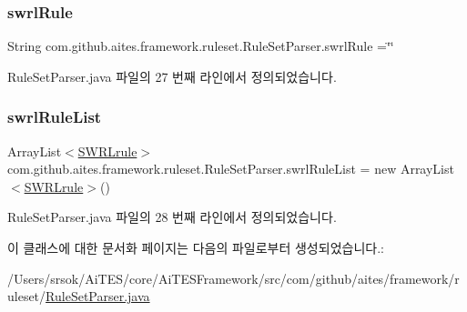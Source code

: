 \subsubsection{\texorpdfstring{swrl\+Rule}{swrlRule}}
{\footnotesize\ttfamily String com.\+github.\+aites.\+framework.\+ruleset.\+Rule\+Set\+Parser.\+swrl\+Rule =\char`\"{}\char`\"{}\hspace{0.3cm}{\ttfamily [private]}}



Rule\+Set\+Parser.\+java 파일의 27 번째 라인에서 정의되었습니다.

\mbox{\label{classcom_1_1github_1_1aites_1_1framework_1_1ruleset_1_1_rule_set_parser_a6896629560a67b1edaa7fc03d33ed350}} 
\subsubsection{\texorpdfstring{swrl\+Rule\+List}{swrlRuleList}}
{\footnotesize\ttfamily Array\+List$<$\mbox{\hyperlink{classcom_1_1github_1_1aites_1_1framework_1_1rule_1_1_s_w_r_lrule}{S\+W\+R\+Lrule}}$>$ com.\+github.\+aites.\+framework.\+ruleset.\+Rule\+Set\+Parser.\+swrl\+Rule\+List = new Array\+List$<$\mbox{\hyperlink{classcom_1_1github_1_1aites_1_1framework_1_1rule_1_1_s_w_r_lrule}{S\+W\+R\+Lrule}}$>$()\hspace{0.3cm}{\ttfamily [private]}}



Rule\+Set\+Parser.\+java 파일의 28 번째 라인에서 정의되었습니다.



이 클래스에 대한 문서화 페이지는 다음의 파일로부터 생성되었습니다.\+:\begin{DoxyCompactItemize}
\item 
/\+Users/srsok/\+Ai\+T\+E\+S/core/\+Ai\+T\+E\+S\+Framework/src/com/github/aites/framework/ruleset/\mbox{\hyperlink{_rule_set_parser_8java}{Rule\+Set\+Parser.\+java}}\end{DoxyCompactItemize}
